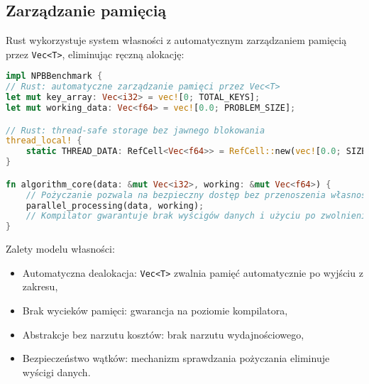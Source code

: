 \subsection{Zarządzanie pamięcią}
Rust wykorzystuje system własności z automatycznym zarządzaniem pamięcią przez \texttt{Vec<T>}, eliminując ręczną alokację:
\begin{lstlisting}[language=Rust, caption={Zarządzanie pamięcią w benchmarkach NPB w języku Rust}, label={lst:rust_memory_management}]
impl NPBBenchmark {
// Rust: automatyczne zarządzanie pamięci przez Vec<T>
let mut key_array: Vec<i32> = vec![0; TOTAL_KEYS];
let mut working_data: Vec<f64> = vec![0.0; PROBLEM_SIZE];

// Rust: thread-safe storage bez jawnego blokowania
thread_local! {
    static THREAD_DATA: RefCell<Vec<f64>> = RefCell::new(vec![0.0; SIZE]);
}

fn algorithm_core(data: &mut Vec<i32>, working: &mut Vec<f64>) {
    // Pożyczanie pozwala na bezpieczny dostęp bez przenoszenia własności
    parallel_processing(data, working);
    // Kompilator gwarantuje brak wyścigów danych i użyciu po zwolnieniu
}
\end{lstlisting}
Zalety modelu własności:
\begin{itemize}
    \item Automatyczna dealokacja: \texttt{Vec<T>} zwalnia pamięć automatycznie po wyjściu z zakresu,
    \item Brak wycieków pamięci: gwarancja na poziomie kompilatora,
    \item Abstrakcje bez narzutu kosztów: brak narzutu wydajnościowego,
    \item Bezpieczeństwo wątków: mechanizm sprawdzania pożyczania eliminuje wyścigi danych.
\end{itemize}


